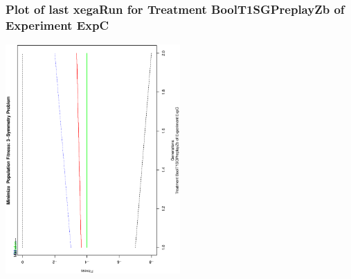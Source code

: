 \begin{frame}
 \frametitle{ Plot of last xegaRun for Treatment BoolT1SGPreplayZb of Experiment ExpC }
 \begin{center}
\includegraphics[width=0.5\textwidth, angle=-90]
{ExpCPlotPopStatsFigure003.eps}
 \end{center}
 \label{report/ExpCPlotPopStatsFigure003.eps}  
 \end{frame}

